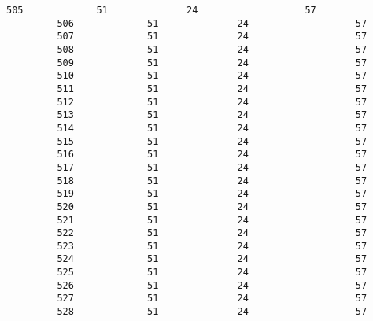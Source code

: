 \documentclass{article}
\begin{document}
\begin{Verbatim}[commandchars=\\\{\}]
         505             51              24                   57   
         506             51              24                   57   
         507             51              24                   57   
         508             51              24                   57   
         509             51              24                   57   
         510             51              24                   57   
         511             51              24                   57   
         512             51              24                   57   
         513             51              24                   57   
         514             51              24                   57   
         515             51              24                   57   
         516             51              24                   57   
         517             51              24                   57   
         518             51              24                   57   
         519             51              24                   57   
         520             51              24                   57   
         521             51              24                   57   
         522             51              24                   57   
         523             51              24                   57   
         524             51              24                   57   
         525             51              24                   57   
         526             51              24                   57   
         527             51              24                   57   
         528             51              24                   57   
         

\end{Verbatim}
\end{document}
